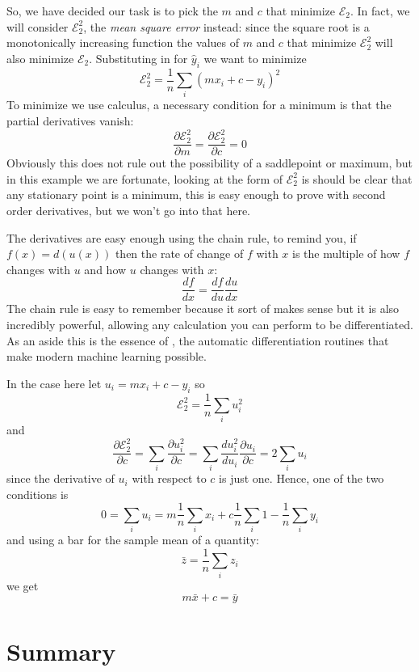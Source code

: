\documentclass[12pt]{article}
\begin{document}
So, we have decided our task is to pick the $m$ and $c$ that minimize
$\mathcal{E}_2$. In fact, we will consider $\mathcal{E}_2^2$, the
\textsl{mean square error} instead: since the square root is a
monotonically increasing function the values of $m$ and $c$ that
minimize $\mathcal{E}_2^2$ will also minimize
$\mathcal{E}_2$. Substituting in for $\hat{y}_i$ we want to minimize
\begin{equation}
\mathcal{E}_2^2=\frac{1}{n}\sum_i(mx_i+c-y_i)^2
\end{equation}
To minimize we use calculus, a necessary condition for a minimum is that the partial derivatives vanish:
\begin{equation}
\frac{\partial \mathcal{E}_2^2}{\partial m}=\frac{\partial \mathcal{E}_2^2}{\partial c}=0
\end{equation}
Obviously this does not rule out the possibility of a saddlepoint or
maximum, but in this example we are fortunate, looking at the form of
$\mathcal{E}_2^2$ is should be clear that any stationary point is a
minimum, this is easy enough to prove with second order derivatives,
but we won't go into that here.

The derivatives are easy enough using the chain rule, to remind you,
if $f(x)=d(u(x))$ then the rate of change of $f$ with $x$ is the
multiple of how $f$ changes with $u$ and how $u$ changes with $x$:
\begin{equation}
\frac{df}{dx}=\frac{df}{du}\frac{du}{dx}
\end{equation}
The chain rule is easy to remember because it sort of makes sense but
it is also incredibly powerful, allowing any calculation you can
perform to be differentiated. As an aside this is the essence of
, the automatic differentiation routines that make
modern machine learning possible. 

In the case here let $u_i=mx_i+c-y_i$ so
\begin{equation}
\mathcal{E}_2^2=\frac{1}{n}\sum_iu_i^2
\end{equation}
and
\begin{equation}
\frac{\partial \mathcal{E}_2^2}{\partial c}=\sum_i\frac{\partial u_i^2}{\partial c}=\sum_i\frac{d u_i^2}{du_i}\frac{\partial u_i}{\partial c}=2\sum_i u_i
\end{equation}
since the derivative of $u_i$ with respect to $c$ is just one. Hence,
one of the two conditions is
\begin{equation}
0=\sum_i u_i = m\frac{1}{n}\sum_i x_i + c\frac{1}{n}\sum_i 1-\frac{1}{n}\sum_i y_i
\end{equation}
and using a bar for the sample mean of a quantity:
\begin{equation}
\bar{z}=\frac{1}{n}\sum_i z_i
\end{equation}
we get
\begin{equation}
m\bar{x}+c=\bar{y}
\end{equation}
 


\section*{Summary}
\end{document}
